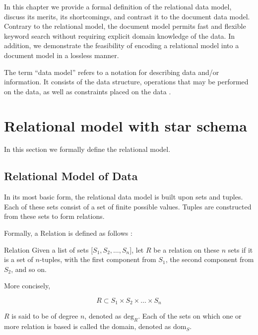 In this chapter we provide a formal definition of the relational data model, discuss its merits, its shortcomings, and contrast it to the document data model.  Contrary to the relational model, the document model permits fast and flexible keyword search without requiring explicit domain knowledge of the data.  In addition, we demonstrate the feasibility of encoding a relational model into a document model in a lossless manner.

The term ``data model'' refers to a notation for describing data and/or information.  It consists of the data structure, operations that may be performed on the data, as well as constraints placed on the data \cite{dbsys-06}.

\section{Relational model with star schema}
	In this section we formally define the relational model.
	
	\subsection{Relational Model of Data}
		In its most basic form, the relational data model is built upon sets and tuples.  Each of these sets consist of a set of finite possible values.  Tuples are constructed from these sets to form relations.
		
		Formally, a Relation is defined as follows \cite{codd-90}:
		
		\begin{defn}{Relation}
			Given a list of sets $\lbrack S_1, S_2, \ldots, S_n\rbrack$, let $R$ be a relation on these $n$ sets if it is a set of $n$-tuples, with the first component from $S_1$, the second component from $S_2$, and so on.
			
			More concisely,
			
			$$R \subset S_1 \times S_2 \times \ldots \times S_n$$
			
			$R$ is said to be of degree $n$, denoted as $\mathrm{deg}_R$.  Each of the sets on which one or more relation is based is called the domain, denoted as $\mathrm{dom}_S$.
		\end{defn}
		
